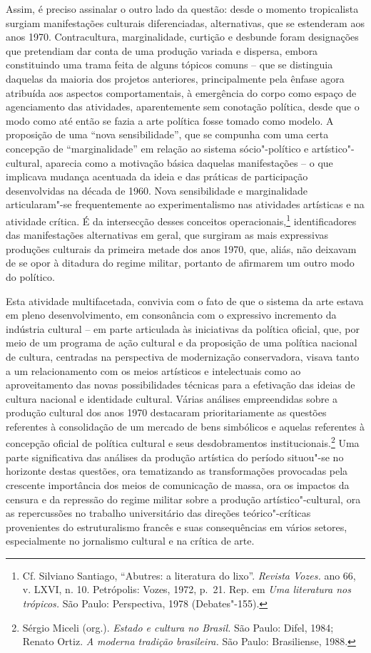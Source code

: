 Assim, é preciso assinalar o outro lado da questão: desde o momento
tropicalista surgiam manifestações culturais diferenciadas,
alternativas, que se estenderam aos anos 1970. Contracultura,
marginalidade, curtição e desbunde foram designações que pretendiam dar
conta de uma produção variada e dispersa, embora constituindo uma trama
feita de alguns tópicos comuns -- que se distinguia daquelas da maioria
dos projetos anteriores, principalmente pela ênfase agora atribuída aos
aspectos comportamentais, à emergência do corpo como espaço de
agenciamento das atividades, aparentemente sem conotação política, desde
que o modo como até então se fazia a arte política fosse tomado como
modelo. A proposição de uma ``nova sensibilidade'', que se compunha com
uma certa concepção de ``marginalidade'' em relação ao sistema
sócio"-político e artístico"-cultural, aparecia como a motivação básica
daquelas manifestações -- o que implicava mudança acentuada da ideia e
das práticas de participação desenvolvidas na década de 1960. Nova
sensibilidade e marginalidade articularam"-se frequentemente ao
experimentalismo nas atividades artísticas e na atividade crítica. É da
intersecção desses conceitos operacionais,\footnote{Cf. Silviano
  Santiago, ``Abutres: a literatura do lixo''. \emph{Revista Vozes.}
  ano 66, v. \textsc{LXVI}, n. 10. Petrópolis: Vozes, 1972, p.~21. Rep. em
  \emph{Uma literatura nos trópicos.} São Paulo: Perspectiva, 1978
  (Debates"-155).} identificadores das manifestações alternativas em
geral, que surgiram as mais expressivas produções culturais da primeira
metade dos anos 1970, que, aliás, não deixavam de se opor à ditadura do
regime militar, portanto de afirmarem um outro modo do político.

Esta atividade multifacetada, convivia com o fato de que o sistema da
arte estava em pleno desenvolvimento, em consonância com o expressivo
incremento da indústria cultural -- em parte articulada às iniciativas
da política oficial, que, por meio de um programa de ação cultural e da
proposição de uma política nacional de cultura, centradas na perspectiva
de modernização conservadora, visava tanto a um relacionamento com os
meios artísticos e intelectuais como ao aproveitamento das novas
possibilidades técnicas para a efetivação das ideias de cultura nacional
e identidade cultural. Várias análises empreendidas sobre a produção
cultural dos anos 1970 destacaram prioritariamente as questões
referentes à consolidação de um mercado de bens simbólicos e aquelas
referentes à concepção oficial de política cultural e seus
desdobramentos institucionais.\footnote{Sérgio Miceli (org.).
  \emph{Estado e cultura no Brasil.} São Paulo: Difel, 1984; Renato
  Ortiz. \emph{A moderna tradição brasileira.} São Paulo: Brasiliense,
  1988.} Uma parte significativa das análises da produção artística do
período situou"-se no horizonte destas questões, ora tematizando as
transformações provocadas pela crescente importância dos meios de
comunicação de massa, ora os impactos da censura e da repressão do
regime militar sobre a produção artístico"-cultural, ora as repercussões
no trabalho universitário das direções teórico"-críticas provenientes do
estruturalismo francês e suas consequências em vários setores,
especialmente no jornalismo cultural e na crítica de arte.

